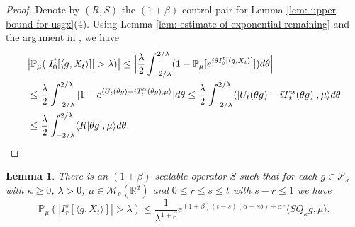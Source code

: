 \documentclass[12pt,oneside,english]{amsart}
\theoremstyle{plain}
\newtheorem{lem}[thm]{Lemma}
\theoremstyle{definition}
\numberwithin{equation}{section}
\newcommand{\added}[1]{{\color{blue}#1}}\newcommand{\deleted}[1]{{\color{red}#1}}
\begin{document}
\begin{proof}
    Denote by $(R,S)$ the $(1+\beta)$-control pair for Lemma \ref{lem: upper bound for usgx}(4).
    Using Lemma \ref{lem: estimate of exponential remaining} and the argument in \cite[Proof of Theorem 3.3.6]{Durrett2010Probability}, we have
\begin{align}
    &\big|\mathbb P_\mu (|I_0^t[\langle g,X_t\rangle]| > \lambda)\big|
    \leq \Big|\frac{\lambda}{2}\int_{-2/\lambda}^{2/\lambda}(1 - \mathbb P_\mu[e^{i\theta I_0^t[\langle g,X_t\rangle]}])d\theta\Big|
    \\&\leq \frac{\lambda}{2}\int_{-2/\lambda}^{2/\lambda}|1-e^{\langle U_t(\theta g)-iT_t^{\alpha}(\theta g),\mu \rangle}|d\theta
    \leq \frac{\lambda}{2}\int_{-2/\lambda}^{2/\lambda}\langle |U_t(\theta g) - iT_t^\alpha(\theta g)|,\mu\rangle d\theta
    \\&\leq \frac{\lambda}{2}\int_{-2/\lambda}^{2/\lambda}\langle R|\theta g|,\mu\rangle d\theta.
      \qedhere
\end{align}
\end{proof}
\begin{lem}\label{lem: temp}
    There is an $(1+\beta)$-scalable operator $S$ such that for each \added{$g\in \mathcal P_{\kappa}$ with $\kappa\geq 0$}, $\lambda >0$, $\mu\in \mathcal M_c(\mathbb R^d)$ and $0\leq r\leq s\leq t$ with $s-r \leq 1$ we have
\[
    \mathbb P_{\mu}(|I_r^s[\langle g, X_t\rangle]|>\lambda)
    \leq \frac{ 1}{\lambda^{1+\beta}} e^{(1+\beta)(t-s)(\alpha- \kappa b)+ \alpha r} \langle SQ_{\kappa}g,\mu\rangle.
\]
\end{lem}
\end{document}
